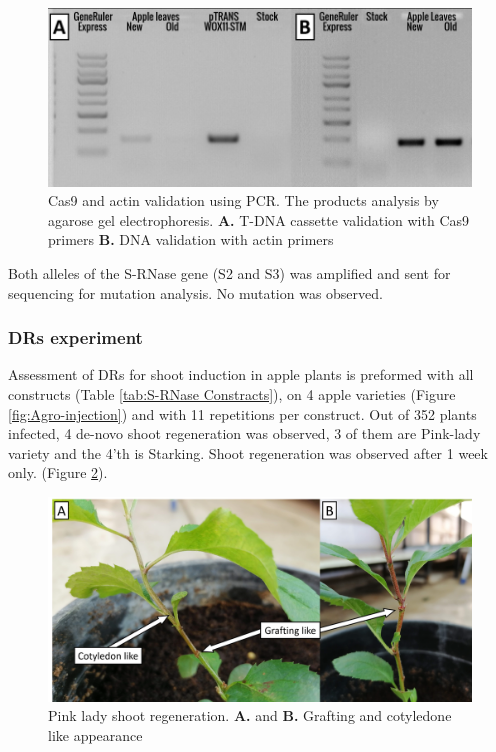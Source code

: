 \documentclass[
]{article}
\begin{document}
\begin{figure}[h]

{\centering \includegraphics[width=0.8\linewidth]{WOX-STM transformant Cas9+Actin3} 

}

\caption{Cas9 and actin validation using PCR. The products analysis by agarose gel electrophoresis. \newline{} \textbf{A.} T-DNA cassette validation with Cas9 primers \textbf{B.} DNA validation with actin primers}\label{fig:Cas9 gene in transformant}
\end{figure}

Both alleles of the S-RNase gene (S2 and S3) was amplified and sent for
sequencing for mutation analysis. No mutation was observed.

\hypertarget{drs-experiment-1}{%
\subsubsection{DRs experiment}\label{drs-experiment-1}}

Assessment of DRs for shoot induction in apple plants is preformed with
all constructs (Table \ref{tab:S-RNase Constracts}), on 4 apple
varieties (Figure \ref{fig:Agro-injection}) and with 11 repetitions per
construct. Out of 352 plants infected, 4 de-novo shoot regeneration was
observed, 3 of them are Pink-lady variety and the 4'th is Starking.
Shoot regeneration was observed after 1 week only. (Figure
\ref{fig:New transformant}).

\begin{figure}[h]

{\centering \includegraphics[width=0.8\linewidth]{Transformant2 results} 

}

\caption{Pink lady shoot regeneration. \newline{} \textbf{A.} and \textbf{B.} Grafting and cotyledone like appearance}\label{fig:New transformant}
\end{figure}
\end{document}
